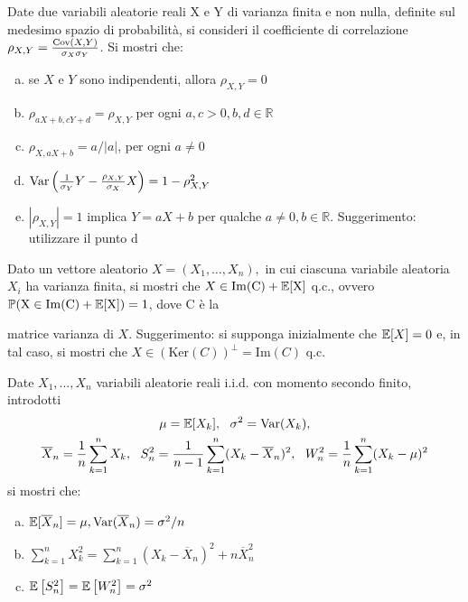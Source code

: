 
\ParteEsercizi

\Esercizio{}

Date due variabili aleatorie reali X e Y di varianza finita e non nulla, definite sul medesimo spazio di probabilità, si consideri il coefficiente di correlazione $\rho _{X,Y} =\frac{\operatorname{Cov} (X,Y)}{\sigma _{X} \sigma _{Y}}$. Si mostri che:
\begin{enumerate}[a)]
	\item se $X$ e $Y$ sono indipendenti, allora $\rho _{X,Y} =0$
	\item $\rho _{aX+b,cY+d} =\rho _{X,Y}$ per ogni $a,c >0,b,d\in \mathbb{R}$
	\item $\rho _{X,aX+b} =a/|a|$, per ogni $a\neq 0$
	\item $\operatorname{Var}\left(\frac{1}{\sigma _{Y}} Y-\frac{\rho _{X,Y}}{\sigma _{X}} X\right)=1-\rho _{X,Y}^{2}$
	\item $| \rho _{X,Y}| =1$ implica $Y=aX+b$ per qualche $a\neq 0,b\in \mathbb{R}$. Suggerimento: utilizzare il punto d
\end{enumerate}

\Esercizio{$\star$}

Dato un vettore aleatorio $X=(X_{1} ,\dots ,X_{n}) ,$ in cui ciascuna variabile aleatoria $X_{i}$ ha varianza finita, si mostri che $X\in \mathrm{Im} (\mathrm{C})+\mathbb{E}[\mathrm{X}]$ q.c., ovvero $\mathbb{P} (\mathrm{X} \in \mathrm{Im} (\mathrm{C})+\mathbb{E}[\mathrm{X}])=1$, dove $\mathrm{C}$ è la

matrice varianza di $X$. Suggerimento: si supponga inizialmente che $\mathbb{E}[X]=0$ e, in tal caso, si mostri che $X\in (\mathrm{Ker} (C))^{\perp } =\mathrm{Im} (C)$ q.c.

\Esercizio{}\label{sec:ese3}

Date $X_{1} ,\dots ,X_{n}$ variabili aleatorie reali i.i.d. con momento secondo finito, introdotti
\begin{gather*}
\mu =\EE[ X_{k}] ,\ \ \sigma ^{2} =\Var(X_{k}) ,\\
\overline{X}_{n} =\frac{1}{n}\sum _{k=1}^{n} X_{k} ,\ \ S_{n}^{2} =\frac{1}{n-1}\sum _{k=1}^{n}(X_{k} -\overline{X}_{n})^{2} ,\ \ W_{n}^{2} =\frac{1}{n}\sum _{k=1}^{n}(X_{k} -\mu)^{2}
\end{gather*}
si mostri che:
\begin{enumerate}[a)]
	\item $\mathbb{E}[\overline{X}_{n}] =\mu ,\operatorname{Var}(\overline{X}_{n}) =\sigma ^{2} /n$
	\item\label{esercizio3b} $\sum _{k=1}^{n} X_{k}^{2} =\sum _{k=1}^{n}(X_{k} -\overline{X}_{n})^{2} +n\overline{X}_{n}^{2}$
	\item $\mathbb{E}\left[ S_{n}^{2}\right] =\mathbb{E}\left[ W_{n}^{2}\right] =\sigma ^{2}$
\end{enumerate}

